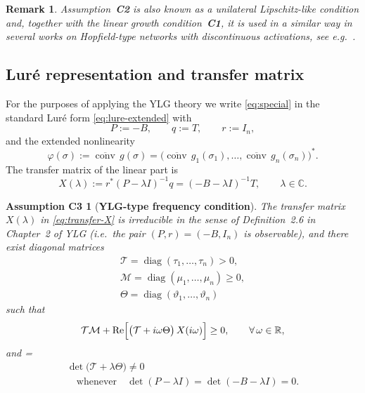 \documentclass[journal]{IEEEtran}
\theoremstyle{myplain}
\newtheorem{remark}{Remark}
\newtheorem*{assumption3}{Assumption C3}
\begin{document}
\begin{remark}
Assumption~\textbf{C2} is also known as a \emph{unilateral
Lipschitz-like} condition and, together with the linear growth
condition~\textbf{C1}, it is used in a similar way in several works
on Hopfield-type networks with discontinuous activations,
see e.g.\ \cite{periodic_time_varying,eq_ref_11,unilateral_Lipschitz_like_condition,
GAS_of_delayed,GAS_discrete_time_varying}.
\end{remark}

\subsection*{Lur\'e representation and transfer matrix}

For the purposes of applying the YLG theory we write
\eqref{eq:special} in the standard Lur\'e form \eqref{eq:lure-extended} with
\begin{equation}\label{eq:Pqr-def}
  P := -B,\qquad
  q := T,\qquad
  r := I_n,
\end{equation}
and the extended nonlinearity
\[
  \varphi(\sigma)
  := \overline{\operatorname{conv}}\,g(\sigma)
  = \bigl(\overline{\operatorname{conv}}\,g_1(\sigma_1),\dots,
          \overline{\operatorname{conv}}\,g_n(\sigma_n)\bigr)^* .
\]
The transfer matrix of the linear part is
\begin{equation}\label{eq:transfer-X}
  X(\lambda) 
  := r^{*}(P-\lambda I)^{-1}q
  = (-B-\lambda I)^{-1}T,
  \qquad \lambda\in\mathbb{C}.
\end{equation}

\begin{assumption3}[\bf YLG-type frequency condition]\label{ass:C3prime}
The transfer matrix $X(\lambda)$ in \eqref{eq:transfer-X} is
irreducible in the sense of Definition~2.6 in Chapter~2 of YLG
(i.e.\ the pair $(P,r)=(-B,I_n)$ is observable), and there exist
diagonal matrices
\begin{multline*}   
   \mathcal{T}=\operatorname{diag}(\tau_1,\dots,\tau_n)> 0,\\
   \mathcal{M}=\operatorname{diag}(\mu_1,\dots,\mu_n)\geq 0,\\
   \Theta=\operatorname{diag}(\vartheta_1,\dots,\vartheta_n)
\end{multline*}
such that
\begin{equation}\label{eq:C3prime-freq}
   \mathcal{T}\mathcal{M}
   + \operatorname{Re}\Bigl[
        \bigl(\mathcal{T} + i\omega \Theta\bigr)\,
        X(i\omega)
      \Bigr]
   \geq 0,
   \qquad \forall\,\omega\in\mathbb{R},
\end{equation}
and
=
\begin{multline}\label{eq:C3prime-det}
    \det\bigl(\mathcal{T} + \lambda \Theta\bigr) \neq 0 \\ 
  \quad\text{whenever}\quad 
  \det(P-\lambda I)=\det(-B-\lambda I)=0.
\end{multline}
\end{assumption3}
\end{document}
